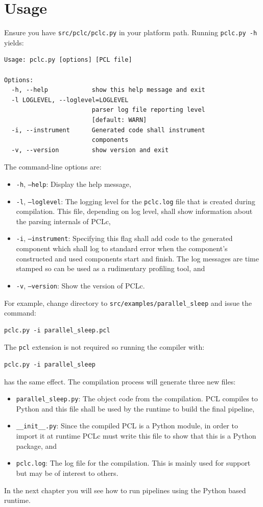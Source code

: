 \section{Usage}\label{sec:pclc-usage}
Ensure you have \texttt{src/pclc/pclc.py} in your platform path. Running \texttt{pclc.py -h} yields:
\begin{verbatim}
Usage: pclc.py [options] [PCL file]

Options:
  -h, --help            show this help message and exit
  -l LOGLEVEL, --loglevel=LOGLEVEL
                        parser log file reporting level
                        [default: WARN]
  -i, --instrument      Generated code shall instrument
                        components
  -v, --version         show version and exit
\end{verbatim}

The command-line options are:
\begin{itemize}
\item \texttt{-h}, \texttt{--help}: Display the help message,
\item \texttt{-l}, \texttt{--loglevel}: The logging level for the \texttt{pclc.log} file that is created during compilation. This file, depending on log level, shall show information about the parsing internals of PCLc,
\item \texttt{-i}, \texttt{--instrument}: Specifying this flag shall add code to the generated component which shall log to standard error when the component's constructed and used components start and finish. The log messages are time stamped so can be used as a rudimentary profiling tool, and
\item \texttt{-v}, \texttt{--version}: Show the version of PCLc.
\end{itemize}

For example, change directory to \texttt{src/examples/parallel\_sleep} and issue the command:
\begin{verbatim}
pclc.py -i parallel_sleep.pcl
\end{verbatim}
The \texttt{pcl} extension is not required so running the compiler with:
\begin{verbatim}
pclc.py -i parallel_sleep
\end{verbatim}
has the same effect.
The compilation process will generate three new files:
\begin{itemize}
\item \texttt{parallel\_sleep.py}: The object code from the compilation. PCL compiles to Python and this file shall be used by the runtime to build the final pipeline,
\item \texttt{\_\_init\_\_.py}: Since the compiled PCL is a Python module, in order to import it at runtime PCLc must write this file to show that this is a Python package, and
\item \texttt{pclc.log}: The log file for the compilation. This is mainly used for support but may be of interest to others.
\end{itemize}

In the next chapter you will see how to run pipelines using the Python based runtime.
